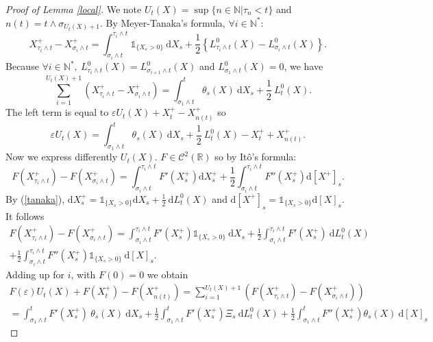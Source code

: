 \documentclass[11pt]{article}
\newcommand{\R}{\mathbb{R}}
\newcommand{\N}{\mathbb{N}}
\newcommand{\di}{\mathrm{d}}
\begin{document}
\begin{proof}[Proof of Lemma \ref{local}]
    We note $U_t(X) = \sup\{n\in\N|\tau_n<t\}$ and $n(t) = t \wedge \sigma_{U_t(X)+1}$. By Meyer-Tanaka's formula, $\forall i\in \N^*$:        
    \begin{equation}\label{tanaka}
    X^+_{\tau_i\wedge t} - X^+_{\sigma_i\wedge t} = \int_{\sigma_i\wedge t}^{\tau_i\wedge t} \mathds{1}_{\{X_s>0\}}\ \di X_s + \frac{1}{2}\left\{L^0_{\tau_i\wedge t}(X)-L^0_{\sigma_i\wedge t}(X)\right\}.
    \end{equation}        
    Because $\forall i\in\N^*,\ L^0_{\tau_{i}\wedge t}(X)=L^0_{\sigma_{i+1}\wedge t}(X)$ and $L^0_{\sigma_1\wedge t}(X)=0$, we have        
    \begin{equation*}
    \sum_{i=1}^{U_t(X)+1}\left(X^+_{\tau_i\wedge t} - X^+_{\sigma_i\wedge t}\right) = \int_{\sigma_1\wedge t}^{t} \theta_s(X)\ \di X_s + \frac{1}{2}\ L^0_{t}(X).
    \end{equation*}
    The left term is equal to $\varepsilon U_t(X)+X^+_t-X^+_{n(t)}$ so
    \begin{equation}\label{Ut}
    \varepsilon U_t(X) = \int_{\sigma_1\wedge t}^{t} \theta_s(X)\ \di X_s + \frac{1}{2}\ L^0_{t}(X) - X^+_t + X^+_{n(t)}.
    \end{equation}
    Now we express differently $U_t(X)$. $F\in\mathcal{C}^2(\R)$ so by Itô's formula:
    \begin{equation*}
    F\left(X^+_{\tau_i\wedge t}\right) - F\left(X^+_{\sigma_i\wedge t}\right) = \int_{\sigma_i\wedge t}^{\tau_i\wedge t} F'\left(X_s^+\right) \di X_s^+ + \frac{1}{2}\int_{\sigma_i\wedge t}^{\tau_i\wedge t} F''\left(X_s^+\right) \di [X^+]_s.
    \end{equation*}
    By (\ref{tanaka}), $\di X_s^+ = \mathds{1}_{\{X_s>0\}}\di X_s + \frac{1}{2}\ \di L^0_t(X)$ and $\di[X^+]_s = \mathds{1}_{\{X_s>0\}}\di[X]_s$. It follows
    \begin{multline*}
    F\left(X^+_{\tau_i\wedge t}\right) - F\left(X^+_{\sigma_i\wedge t}\right) = \int_{\sigma_i\wedge t}^{\tau_i\wedge t} F'\left(X_s^+\right) \mathds{1}_{\{X_s>0\}}\ \di X_s + \frac{1}{2}\int_{\sigma_i\wedge t}^{\tau_i\wedge t} F'(X_s^+)\ \di L^0_t(X)\\ + \frac{1}{2}\int_{\sigma_i\wedge t}^{\tau_i\wedge t} F''\left(X_s^+\right) \mathds{1}_{\{X_s>0\}}\ \di [X]_s.
    \end{multline*}
    Adding up for $i$, with $F(0) = 0$ we obtain
    \begin{multline*}
    F(\varepsilon)U_t(X)+F\left(X^+_t\right)-F\left(X^+_{n(t)}\right) = \sum_{i=1}^{U_t(X)+1} \left(F\left(X^+_{\tau_i\wedge t}\right) - F\left(X^+_{\sigma_i\wedge t}\right)\right)\\=\int_{\sigma_1\wedge t}^{ t} F'(X_s^+)\ \theta_s(X)\ \di X_s + \frac{1}{2}\int_{\sigma_1\wedge t}^{t} F'\left(X_s^+\right)\Xi_s\ \di L^0_t(X) + \frac{1}{2}\int_{\sigma_1\wedge t}^{t} F''\left(X_s^+\right)\theta_s(X)\ \di [X]_s

\end{multline*}
\end{proof}
\end{document}
